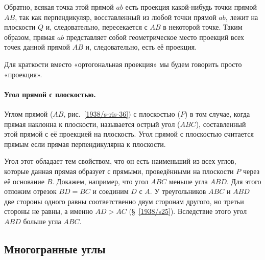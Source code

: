 Обратно, всякая точка этой прямой $ab$ есть проекция какой-нибудь точки прямой $AB$, так как перпендикуляр, восставленный из любой точки прямой $ab$, лежит на плоскости $Q$ и, следовательно, пересекается с $AB$ в некоторой точке.
Таким образом, прямая $ab$ представляет собой геометрическое место проекций всех точек данной прямой $AB$ и, следовательно, есть её проекция.

Для краткости вместо «ортогональная проекция» мы будем говорить просто «проекция».

\paragraph{Угол прямой с плоскостью.}\label{1938/s48}
Углом прямой ($AB$, рис.~\ref{1938/s-ris-36}) с плоскостью ($P$) в том случае, когда прямая наклонна к плоскости, называется острый угол ($ABC$), составленный этой прямой с её проекцией на плоскость.
Угол прямой с плоскостью считается прямым если прямая перпендикулярна к плоскости.

Угол этот обладает тем свойством, что он есть наименьший из всех углов, которые данная прямая образует с прямыми, проведёнными на плоскости $P$ через её основание $B$.
Докажем, например, что угол $ABC$ меньше угла $ABD$.
Для этого отложим отрезок $BD=BC$ и соединим $D$ с $A$.
У треугольников $ABC$ и $ABD$ две стороны одного равны соответственно двум сторонам другого, но третьи стороны не равны, а именно $AD>AC$ (§~\ref{1938/s25}).
Вследствие этого угол $ABD$ больше угла $ABC$.

\subsection*{Многогранные углы}

